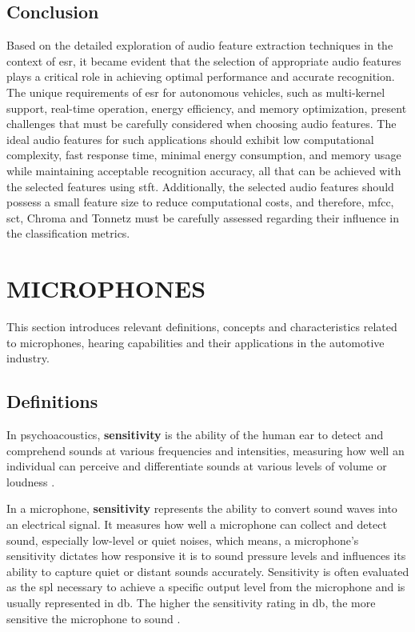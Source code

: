 \subsection{Conclusion}
\label{subsec:audio_fundamentals_conclusion}

Based on the detailed exploration of audio feature extraction techniques in the context of \gls{esr}, it became evident that the selection of appropriate audio features plays a critical role in achieving optimal performance and accurate recognition. The unique requirements of \gls{esr} for autonomous vehicles, such as multi-kernel support, real-time operation, energy efficiency, and memory optimization, present challenges that must be carefully considered when choosing audio features. The ideal audio features for such applications should exhibit low computational complexity, fast response time, minimal energy consumption, and memory usage while maintaining acceptable recognition accuracy, all that can be achieved with the selected features using \gls{stft}. Additionally, the selected audio features should possess a small feature size to reduce computational costs, and therefore, \gls{mfcc}, \gls{sct}, Chroma and Tonnetz must be carefully assessed regarding their influence in the classification metrics.


\section{MICROPHONES}
\label{sec:frmwk_microphones}

This section introduces relevant definitions, concepts and characteristics related to microphones, hearing capabilities and their applications in the automotive industry.


\subsection{Definitions}
\label{subsec:microphones_definitions}

In psychoacoustics, \textbf{sensitivity} is the ability of the human ear to detect and comprehend sounds at various frequencies and intensities, measuring how well an individual can perceive and differentiate sounds at various levels of volume or loudness \cite{Moore2013}.

In a microphone, \textbf{sensitivity} represents the ability to convert sound waves into an electrical signal. It measures how well a microphone can collect and detect sound, especially low-level or quiet noises, which means, a microphone's sensitivity dictates how responsive it is to sound pressure levels and influences its ability to capture quiet or distant sounds accurately. Sensitivity is often evaluated as the \gls{spl} necessary to achieve a specific output level from the microphone and is usually represented in \gls{db}. The higher the sensitivity rating in \gls{db}, the more sensitive the microphone to sound \cite{Rayburn2004}.


